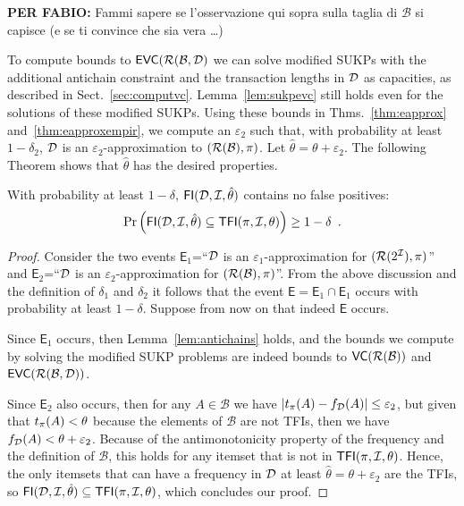 {\bf PER FABIO:} Fammi sapere se l'osservazione qui sopra sulla taglia di
$\mathcal{B}$ si capisce (e se ti convince che sia vera \ldots)

To compute bounds to $\mathsf{EVC}(\mathcal{R}(\mathcal{B},{\cal D})$ we can solve modified SUKPs
with the additional antichain constraint and the transaction lengths in ${\cal D}$ as
capacities, as described in Sect.~\ref{sec:computvc}. Lemma~\ref{lem:sukpevc}
still holds even for the solutions of these modified SUKPs. Using these bounds
in Thms.~\ref{thm:eapprox} and~\ref{thm:eapproxempir}, we compute an
$\varepsilon_2$ such that, with probability at least $1-\delta_2$, ${\cal D}$ is an
$\varepsilon_2$-approximation to $(\mathcal{R}(\mathcal{B}),\pi)$. Let
$\hat{\theta}=\theta+\varepsilon_2$. The following Theorem shows that
$\hat{\theta}$ has the desired properties.

\begin{theorem}\label{lem:vcfull}
With probability at least $1-\delta$, $\mathsf{FI}({\cal D},{\cal I},\hat\theta)$ contains no
false positives:
\[
\Pr\left(\mathsf{FI}({\cal D},{\cal I},\hat\theta)\subseteq\mathsf{TFI}(\pi,{\cal I},\theta)\right)\ge 1-\delta\enspace.\]
\end{theorem}
\begin{proof}
  Consider the two events $\mathsf{E}_1$=``${\cal D}$ is an
  $\varepsilon_1$-approximation for $(\mathcal{R}(2^{\cal I}),\pi)$'' and
  $\mathsf{E}_2$=``${\cal D}$ is an $\varepsilon_2$-approximation for
  $(\mathcal{R}(\mathcal{B}),\pi)$''. From the above discussion and the definition
  of $\delta_1$ and $\delta_2$ it follows that the event
  $\mathsf{E}=\mathsf{E}_1\cap\mathsf{E}_1$ occurs with probability at least
  $1-\delta$. Suppose from now on that indeed $\mathsf{E}$ occurs.

  Since $\mathsf{E}_1$ occurs, then Lemma~\ref{lem:antichains} holds, and the
  bounds we compute by solving the modified SUKP problems are indeed bounds to
  $\mathsf{VC}(\mathcal{R}(\mathcal{B}))$ and $\mathsf{EVC}(\mathcal{R}(\mathcal{B},{\cal D}))$.

  Since $\mathsf{E}_2$ also occurs, then for any $A\in\mathcal{B}$ we have
  $|t_\pi(A)-f_{\cal D}(A)|\le\varepsilon_2$, but given that $t_\pi(A)<\theta$
  because the elements of $\mathcal{B}$ are not TFIs, then we have
  $f_{\cal D}(A)<\theta+\varepsilon_2$. Because of the antimonotonicity property of
  the frequency and the definition of $\mathcal{B}$, this holds for any itemset
  that is not in $\mathsf{TFI}(\pi,{\cal I},\theta)$. Hence, the only itemsets that can
  have a frequency in ${\cal D}$ at least $\hat{\theta}=\theta+\varepsilon_2$ are the
  TFIs, so $\mathsf{FI}({\cal D},{\cal I},\hat{\theta})\subseteq\mathsf{TFI}(\pi,{\cal I},\theta)$, which
  concludes our proof.
\end{proof}

